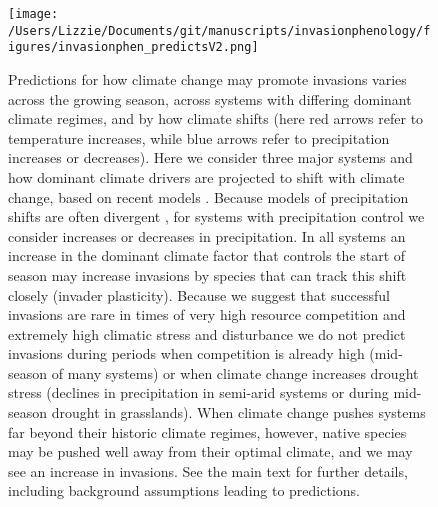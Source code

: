 \documentclass[11pt,a4paper,oneside]{article}
\begin{document}
\newpage
\begin{figure}[h!]
\centering \texttt{[image: /Users/Lizzie/Documents/git/manuscripts/invasionphenology/figures/invasionphen\_predictsV2.png]}
\caption{Predictions for how climate change may promote invasions varies across the growing season, across systems with differing dominant climate regimes, and by how climate shifts (here red arrows refer to temperature increases, while blue arrows refer to precipitation increases or decreases). Here we consider three major systems and how dominant climate drivers are projected to shift with climate change, based on recent models \citep{knutti2013}. Because models of precipitation shifts are often divergent \citep{knutti2013}, for systems with precipitation control we consider increases or decreases in precipitation. In all systems an increase in the dominant climate factor that controls the start of season may increase invasions by species that can track this shift closely (invader plasticity). Because we suggest that successful invasions are rare in times of very high resource competition and extremely high climatic stress and disturbance we do not predict invasions during periods when competition is already high (mid-season of many systems) or when climate change increases drought stress (declines in precipitation in semi-arid systems or during mid-season drought in grasslands). When climate change pushes systems far beyond their historic climate regimes, however, native species may be pushed well away from their optimal climate, and we may see an increase in invasions. See the main text for further details, including background assumptions leading to predictions.}
\end{figure}
\end{document}

